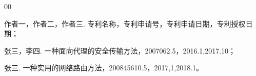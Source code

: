 \begin{patent}{00}

    \item [{[1]}]  作者一，作者二，作者三. 专利名称，专利申请号，专利申请日期，专利授权日期；
    
    \item [{[2]}]  张三，李四. 一种面向代理的安全传输方法，2007062.5，2016.1,2017.10；
    
    \item [{[3]}]  张三. 一种实用的网络路由方法，200845610.5，2017,1,2018.1。

\end{patent}

